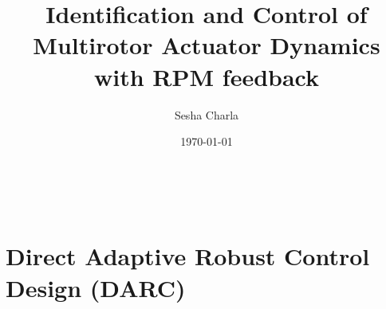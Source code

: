 \documentclass[letterpaper, 11pt]{article}
\title{Identification and Control of Multirotor Actuator Dynamics with RPM feedback}
\author{Sesha Charla}
\date{\today}
\begin{document}
\maketitle
\tableofcontents
\newpage
\
\newpage

\newpage

\newpage

\newpage
\section{Direct Adaptive Robust Control Design (DARC)}


\newpage


\end{document}
